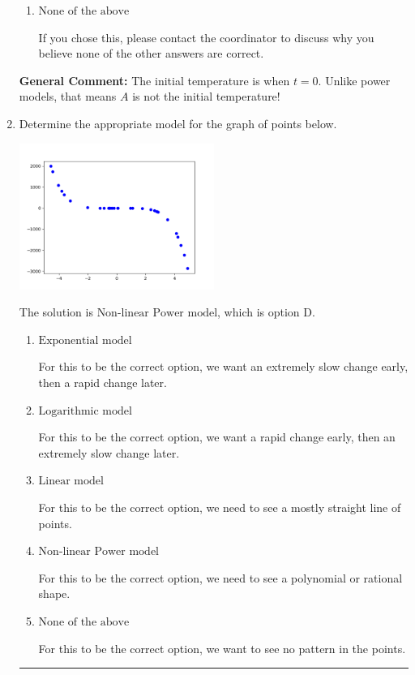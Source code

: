 \documentclass{extbook}[14pt]
\newcommand{\litem}[1]{\item #1

\rule{\textwidth}{0.4pt}}
\begin{document}
\begin{enumerate}
{\begin{enumerate}[label=\Alph*.]
This uses $A$ correctly but solves for $k$ incorrectly.
\item \( \text{None of the above} \)

If you chose this, please contact the coordinator to discuss why you believe none of the other answers are correct.
\end{enumerate}

\textbf{General Comment:} The initial temperature is when $t = 0$. Unlike power models, that means $A$ is not the initial temperature!
}
\litem{
Determine the appropriate model for the graph of points below.

\begin{center}
    \includegraphics[width=0.5\textwidth]{../Figures/identifyModelGraph12B.png}
\end{center}


The solution is \( \text{Non-linear Power model} \), which is option D.\begin{enumerate}[label=\Alph*.]
\item \( \text{Exponential model} \)

For this to be the correct option, we want an extremely slow change early, then a rapid change later.
\item \( \text{Logarithmic model} \)

For this to be the correct option, we want a rapid change early, then an extremely slow change later.
\item \( \text{Linear model} \)

For this to be the correct option, we need to see a mostly straight line of points.
\item \( \text{Non-linear Power model} \)

For this to be the correct option, we need to see a polynomial or rational shape.
\item \( \text{None of the above} \)

For this to be the correct option, we want to see no pattern in the points.
\end{enumerate}

}
\end{enumerate}
\end{document}
